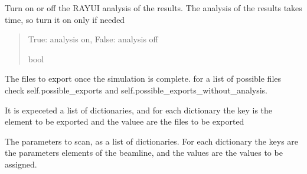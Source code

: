 \documentclass[letterpaper,10pt,english]{sphinxmanual}
\begin{document}
\begin{fulllineitems}
\begin{quote}
\begin{description}
\end{description}\end{quote}

\begin{fulllineitems}
\label{\detokenize{code_documentation:raypyng.simulate.Simulate.analyze}}
\pysigstartsignatures
{}
\pysigstopsignatures
\sphinxAtStartPar
Turn on or off the RAY\sphinxhyphen{}UI analysis of the results.
The analysis of the results takes time, so turn it on only if needed
\begin{quote}\begin{description}
\sphinxAtStartPar
True: analysis on, False: analysis off

\sphinxAtStartPar
bool

\end{description}\end{quote}

\end{fulllineitems}


\begin{fulllineitems}
\label{\detokenize{code_documentation:raypyng.simulate.Simulate.exports}}
\pysigstartsignatures
{}
\pysigstopsignatures
\sphinxAtStartPar
The files to export once the simulation is complete.
for a list of possible files check self.possible\_exports
and self.possible\_exports\_without\_analysis.

\sphinxAtStartPar
It is expeceted a list of dictionaries, and for each dictionary the key is the element
to be exported and the valuee are the files to be exported

\end{fulllineitems}


\begin{fulllineitems}
\label{\detokenize{code_documentation:raypyng.simulate.Simulate.params}}
\pysigstartsignatures
{}
\pysigstopsignatures
\sphinxAtStartPar
The parameters to scan, as a list of dictionaries.
For each dictionary the keys are the parameters elements of the beamline, and the values are the
values to be assigned.


\end{fulllineitems}
\end{fulllineitems}
\end{document}
